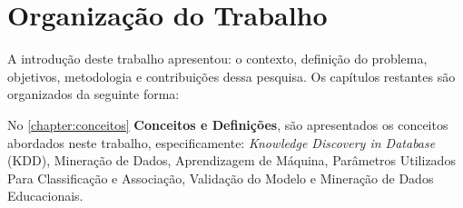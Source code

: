 





\section{Organização do Trabalho}
A introdução deste trabalho apresentou: o contexto, definição do problema, objetivos, metodologia e contribuições dessa pesquisa. Os capítulos restantes são organizados da seguinte forma:

\par
No \autoref{chapter:conceitos} \textbf{Conceitos e Definições}, são apresentados os conceitos abordados neste trabalho, especificamente: \textit{Knowledge Discovery in Database} (KDD), Mineração de Dados, Aprendizagem de Máquina, Parâmetros Utilizados Para Classificação e Associação, Validação do Modelo e Mineração de Dados Educacionais.

